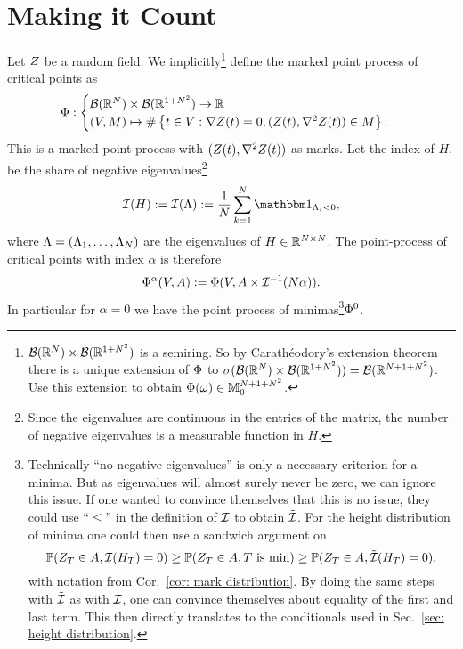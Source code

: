 \section{Making it Count}

\begin{definition}
	Let \(\rf\) be a random field. We implicitly\footnote{
		\(\borel(\real^\dimension)\times\borel(\real^{1+\dimension^2})\) is a semiring. So by
		Carathéodory's extension theorem there is a unique extension of
		\(\crit\) to
		\(\sigma(\borel(\real^\dimension)\times\borel(\real^{1+\dimension^2}))=\borel(\real^{\dimension+1+\dimension^2})\).
		Use this extension to obtain \(\crit(\omega)\in\locFiniteMeasure[\dimension+1+\dimension^2]\).
	} define the marked point process of critical points as
	\begin{align*}
		\crit:
		\begin{cases}
			\borel(\real^\dimension)\times\borel(\real^{1+\dimension^2}) \to \real\\
			(\Vol, M) \mapsto
			\#\left\{t\in\Vol:
				\nabla\rf(t)=0,
				(\rf(t), \nabla^2 \rf(t))\in M
			\right\}.
		\end{cases}
	\end{align*}
	This is a marked point process with \((\rf(t), \nabla^2\rf(t))\) as marks.
	Let the index of \(H\), be the share of negative eigenvalues\footnote{
		Since the eigenvalues are continuous in the entries of the matrix, the
		number of negative eigenvalues is a measurable function in \(H\).
	}
	\[
		\negEV(H) := \negEV(\Lambda) := \frac1\dimension \sum_{k=1}^\dimension \ind_{\Lambda_i < 0},
	\]
	where \(\Lambda=(\Lambda_1,\dots,\Lambda_\dimension)\) are the eigenvalues of
	\(H\in\real^{\dimension\times\dimension}\).
	The point-process of critical points with index \(\alpha\) is therefore
	\[
		\crit^\alpha(\Vol, A)
		:= \crit(\Vol, A\times\negEV^{-1}(\dimension\alpha)).
	\]
	In particular for \(\alpha=0\) we have the point process of minimas\footnote{
		Technically ``no negative eigenvalues'' is only a necessary criterion for a
		minima. But as eigenvalues will almost surely never be zero, we can
		ignore this issue. If one wanted to convince themselves that this is
		no issue, they could use ``\(\le\)'' in the definition of \(\negEV\) to
		obtain \(\tilde{\negEV}\). For the height distribution of minima one
		could then use a sandwich argument on
		\[
			\Pr(\rf_T\in A, \negEV(H_T) = 0)
			\ge \Pr(\rf_T\in A, T\text{ is min})
			\ge \Pr(\rf_T\in A, \tilde{\negEV}(H_T) = 0),
		\]
		with notation from Cor.~\ref{cor: mark distribution}.
		By doing the same steps with \(\tilde{\negEV}\) as with
		\(\negEV\), one can convince themselves about equality of the first and
		last term. This then directly translates to the conditionals used in
		Sec.~\ref{sec: height distribution}.
	}\(\crit^0\).
\end{definition}
